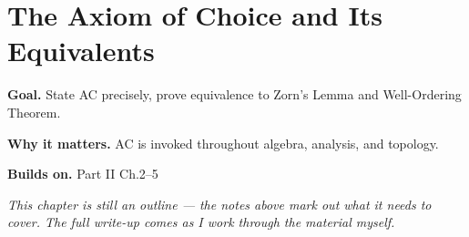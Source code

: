 \chapter{The Axiom of Choice and Its Equivalents}
\label{ch:02-set-theory-06}

\begin{chapterintro}
\textbf{Goal.} State AC precisely, prove equivalence to Zorn's Lemma and Well-Ordering Theorem.

\textbf{Why it matters.} AC is invoked throughout algebra, analysis, and topology.

\textbf{Builds on.} Part II Ch.2–5
\end{chapterintro}

\textit{This chapter is still an outline --- the notes above mark out what it needs to cover. The full write-up comes as I work through the material myself.}
